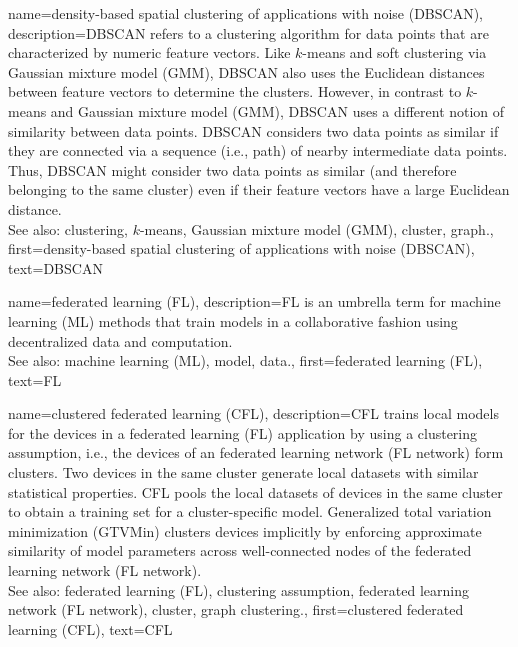 {
{name={density-based spatial clustering of applications with noise (DBSCAN)}, 
	description={DBSCAN 
		refers to a clustering algorithm for data points that are characterized by numeric feature vectors. 
		Like $k$-means and soft clustering via Gaussian mixture model (GMM), DBSCAN also uses the Euclidean 
		distances between feature vectors to determine the clusters. However, in contrast to $k$-means 
		and Gaussian mixture model (GMM), DBSCAN uses a different notion of similarity between data points. 
		DBSCAN considers two data points as similar if they are connected 
		via a sequence (i.e., path) of nearby intermediate data points. Thus, DBSCAN might consider 
		two data points as similar (and therefore belonging to the same cluster) even if 
		their feature vectors have a large Euclidean distance.
				\\
		See also: clustering, $k$-means, Gaussian mixture model (GMM), cluster, graph.},
	first={density-based spatial clustering of applications with noise (DBSCAN)},
	text={DBSCAN} 
}

{name={federated learning (FL)}, 
	description={FL 
		is an umbrella term for machine learning (ML) methods that train models in a collaborative 
		fashion using decentralized data and computation.
				\\
		See also: machine learning (ML), model, data.},
	first={federated learning (FL)},
	text={FL} 
}
	
{name={clustered federated learning (CFL)}, 
	description={CFL trains local models for the 
 		devices in a federated learning (FL) application by using a clustering assumption, i.e., the devices 
 		of an federated learning network (FL network) form clusters. Two devices in the same cluster generate 
 		local datasets with similar statistical properties. CFL pools the local datasets of devices 
 		in the same cluster to obtain a training set for a cluster-specific model. 
 		Generalized total variation minimization (GTVMin) clusters devices implicitly by enforcing approximate similarity of model parameters 
 		across well-connected nodes of the federated learning network (FL network).\\ 
 		See also: federated learning (FL), clustering assumption, federated learning network (FL network), cluster, graph clustering.},
	first={clustered federated learning (CFL)},
	text={CFL} 
}

}
